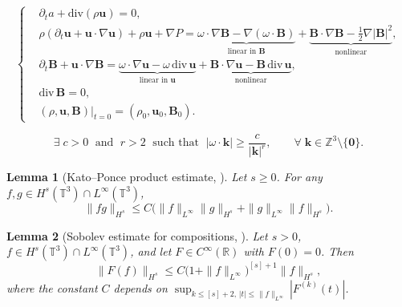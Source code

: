 \documentclass[10pt,a4paper]{amsart}
\newtheorem{lemma}{Lemma}
\def\b{ \mathbf{B} }
\begin{document}
\begin{equation}\label{MHD1}
	\left\{
	\begin{aligned}
		&\partial_t a + \mathrm{div}(\rho\mathbf{u}) = 0, \\[4pt]
		&\rho(\partial_t\mathbf{u} + \mathbf{u}\cdot\nabla\mathbf{u}) + \rho\mathbf{u}
		+ \nabla P
		= \underbrace{\omega\cdot\nabla\b
			- \nabla(\omega\cdot\b)}_{\text{linear in }\b}
		+ \underbrace{\b\cdot\nabla\b
			- \tfrac{1}{2}\nabla|\b|^2}_{\text{nonlinear}}, \\[4pt]
		&\partial_t\b + \mathbf{u}\cdot\nabla\b
		= \underbrace{\omega\cdot\nabla\mathbf{u} - \omega\,\mathrm{div}\,\mathbf{u}}_{\text{linear in }\mathbf{u}}
		+ \underbrace{\b\cdot\nabla\mathbf{u} - \b\,\mathrm{div}\,\mathbf{u}}_{\text{nonlinear}}, \\[4pt]
		&\mathrm{div}\,\b = 0, \\[4pt]
		&(\rho,\mathbf{u},\b)|_{t=0} = (\rho_0,\mathbf{u}_0,\b_0).
	\end{aligned}
	\right.
\end{equation}

\begin{equation}\label{Diophantine0}
	\exists\; c>0 \;\text{ and }\; r>2 \;\text{ such that }\;
	|\omega\cdot\mathbf{k}| \geq \frac{c}{|\mathbf{k}|^r}, \qquad
	\forall\;\mathbf{k}\in\mathbb{Z}^3\setminus\{\mathbf{0}\}.
\end{equation}

\begin{lemma}[Kato--Ponce product estimate, {\cite{kato}}]
	\label{Hk-estimate}
	Let $s\geq 0$.  For any
	$f,g\in H^s(\mathbb{T}^3)\cap L^\infty(\mathbb{T}^3)$,
	\begin{equation}\label{KP-product}
		\|fg\|_{H^s}
		\leq C\bigl(\|f\|_{L^\infty}\|g\|_{H^s}
		+ \|g\|_{L^\infty}\|f\|_{H^s}\bigr).
	\end{equation}
\end{lemma}

\begin{lemma}[Sobolev estimate for compositions, {\cite{Triebel}}]
	\label{Hk-estimate-1}
	Let $s>0$, $f\in H^s(\mathbb{T}^3)\cap L^\infty(\mathbb{T}^3)$, and
	let $F\in C^\infty(\mathbb{R})$ with $F(0)=0$.  Then
	\begin{equation}\label{composition}
		\|F(f)\|_{H^s}
		\leq C\bigl(1+\|f\|_{L^\infty}\bigr)^{[s]+1}\|f\|_{H^s},
	\end{equation}
	where the constant $C$ depends on
	$\sup_{k\leq[s]+2,\,|t|\leq\|f\|_{L^\infty}}|F^{(k)}(t)|$.
\end{lemma}
\end{document}
